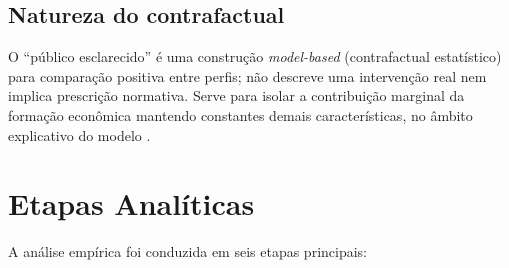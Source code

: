\subsection{Natureza do contrafactual}
O “público esclarecido” é uma construção \textit{model-based} (contrafactual estatístico) para comparação positiva entre perfis; não descreve uma intervenção real nem implica prescrição normativa. Serve para isolar a contribuição marginal da formação econômica mantendo constantes demais características, no âmbito explicativo do modelo \cite{hausman2008}.



\section{Etapas Analíticas}

A análise empírica foi conduzida em seis etapas principais:

